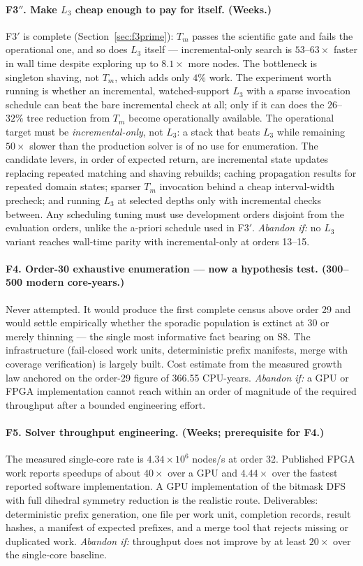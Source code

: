 \documentclass[11pt,a4paper]{article}
\theoremstyle{definition}
\begin{document}
\paragraph{F3$''$. Make $L_3$ cheap enough to pay for itself. (Weeks.)}
F3$'$ is complete (Section~\ref{sec:f3prime}): $T_m$ passes the scientific gate
and fails the operational one, and so does $L_3$ itself --- incremental-only
search is $53$--$63\times$ faster in wall time despite exploring up to $8.1\times$
more nodes. The bottleneck is singleton shaving, not $T_m$, which adds only $4\%$
work. The experiment worth running is whether an incremental, watched-support
$L_3$ with a sparse invocation schedule can beat the bare incremental check at
all; only if it can does the $26$--$32\%$ tree reduction from $T_m$ become
operationally available. The operational target must be
\emph{incremental-only}, not $L_3$: a stack that beats $L_3$ while remaining
$50\times$ slower than the production solver is of no use for enumeration. The
candidate levers, in order of expected return, are incremental state updates
replacing repeated matching and shaving rebuilds; caching propagation results for
repeated domain states; sparser $T_m$ invocation behind a cheap interval-width
precheck; and running $L_3$ at selected depths only with incremental checks
between. Any scheduling tuning must use development orders disjoint from the
evaluation orders, unlike the a-priori schedule used in F3$'$.
\emph{Abandon if:} no $L_3$ variant reaches wall-time parity with
incremental-only at orders 13--15.

\paragraph{F4. Order-30 exhaustive enumeration --- now a hypothesis test. (300--500 modern core-years.)}
Never attempted. It would produce the first complete census above order 29 and
would settle empirically whether the sporadic population is extinct at 30 or
merely thinning --- the single most informative fact bearing on S8. The
infrastructure (fail-closed work units, deterministic prefix manifests, merge
with coverage verification) is largely built. Cost estimate from the measured
growth law anchored on the order-29 figure of 366.55 CPU-years. \emph{Abandon
if:} a GPU or FPGA implementation cannot reach within an order of magnitude of
the required throughput after a bounded engineering effort.

\paragraph{F5. Solver throughput engineering. (Weeks; prerequisite for F4.)}
The measured single-core rate is $4.34\times10^6$ nodes/s at order 32. Published
FPGA work reports speedups of about $40\times$ over a GPU and $4.44\times$ over
the fastest reported software implementation. A GPU implementation of the bitmask
DFS with full dihedral symmetry reduction is the realistic route. Deliverables:
deterministic prefix generation, one file per work unit, completion records,
result hashes, a manifest of expected prefixes, and a merge tool that rejects
missing or duplicated work. \emph{Abandon if:} throughput does not improve by at
least $20\times$ over the single-core baseline.
\end{document}
